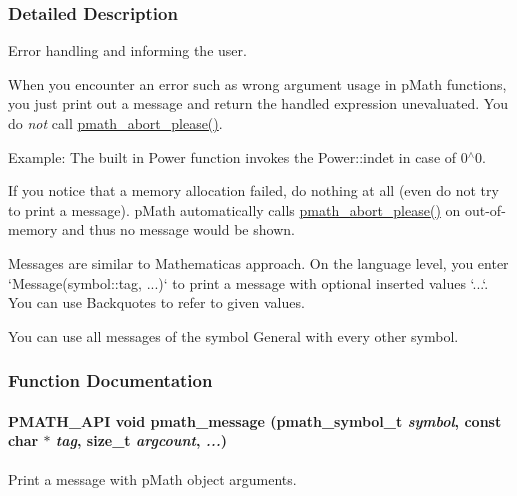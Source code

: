 \subsubsection{Detailed Description}
Error handling and informing the user. 

When you encounter an error such as wrong argument usage in pMath functions, you just print out a message and return the handled expression unevaluated. You do {\em not\/} call \hyperlink{group__threads_g84e45036b76764def6390af12d2070bf}{pmath\_\-abort\_\-please()}.

Example: The built in Power function invokes the Power::indet in case of 0$^\wedge$0.

If you notice that a memory allocation failed, do nothing at all (even do not try to print a message). pMath automatically calls \hyperlink{group__threads_g84e45036b76764def6390af12d2070bf}{pmath\_\-abort\_\-please()} on out-of-memory and thus no message would be shown.

Messages are similar to Mathematicas approach. On the language level, you enter `Message(symbol::tag, ...)` to print a message with optional inserted values `...`. You can use Backquotes to refer to given values.

You can use all messages of the symbol General with every other symbol. 

\subsubsection{Function Documentation}
\hypertarget{group__messages_g0b94d5352ce3c6df0ca458d3c5cd7e15}{
\paragraph[{pmath\_\-message}]{\setlength{\rightskip}{0pt plus 5cm}PMATH\_\-API void pmath\_\-message ({\bf pmath\_\-symbol\_\-t} {\em symbol}, \/  const char $\ast$ {\em tag}, \/  size\_\-t {\em argcount}, \/   {\em ...})}\hfill}
\label{group__messages_g0b94d5352ce3c6df0ca458d3c5cd7e15}


Print a message with pMath object arguments. 

